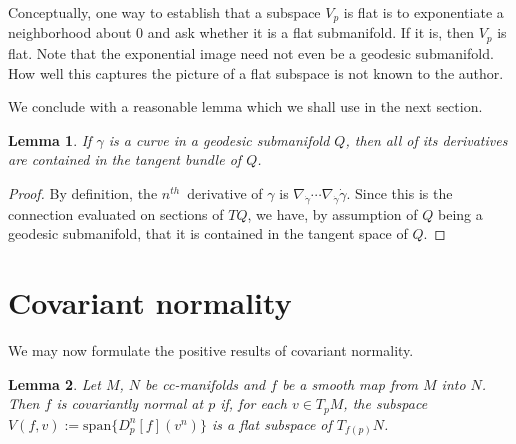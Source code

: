 \documentclass[11pt]{article}
\newtheorem{lemma}{Lemma}
\theoremstyle{remark}
\begin{document}
Conceptually, one way to establish that a subspace $V_p$ is flat is to
exponentiate a neighborhood about $0$ and ask whether it is a flat
submanifold. If it is, then $V_p$ is flat. Note that the exponential
image need not even be a geodesic submanifold. How well this captures
the picture of a flat subspace is not known to the author.

We conclude with a reasonable lemma which we shall use in the next
section. 

\begin{lemma} \label{tl:curve}
If $\gamma$ is a curve in a geodesic submanifold $Q$, then all of its
derivatives are contained in the tangent bundle of $Q$. 
\end{lemma}

\begin{proof}
By definition, the \ensuremath{{n}^{th}}\ derivative of $\gamma$ is 
$\nabla_{\dot{\gamma}} \cdots \nabla_{\dot{\gamma}}
\dot{\gamma}$. Since this is the connection evaluated on sections of
$TQ$, we have, by assumption of $Q$ being a geodesic submanifold, that
it is contained in the tangent space of $Q$. 
\end{proof}


\section{Covariant normality} \label{s:maptay}

We may now formulate the positive results of covariant normality.


\begin{lemma} \label{tl:sub}
Let $M$, $N$ be cc-manifolds and $f$ be a smooth map from $M$ into
$N$. Then $f$ is covariantly normal at $p$ if, for each $v \in T_pM$, 
the subspace $ V(f,v) \ensuremath{:=} \text{span}\{ \ensuremath{D_{p}^{n} {[f]} ({v^n}) } \} $ is a
flat subspace of $T_{f(p)}N$. 
\end{lemma}
\end{document}

